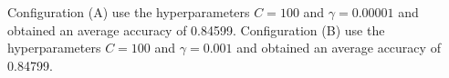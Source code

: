 Configuration (A) use the hyperparameters $C = 100$ and $\gamma = 0.00001$
and obtained an average accuracy of 0.84599. Configuration (B) use the
hyperparameters $C = 100$ and $\gamma = 0.001$ and obtained an average accuracy
of 0.84799.

%
